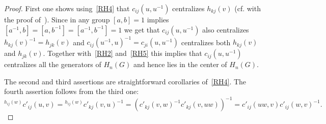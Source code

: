 \documentclass[oneside, 12pt]{amsart}
\theoremstyle{plain}
\numberwithin{equation}{section}
\numberwithin{lemma}{section}
\theoremstyle{remark}
\theoremstyle{definition}
\begin{document}
\begin{proof}
First one shows using~\eqref{RH4} that $c_{ij}(u, u^{-1})$ centralizes $h_{kj}(v)$ (cf. with the proof of~\cite[Lemma~2.1(2)]{Reh78}).
Since in any group $[a, b]=1$ implies $[a^{-1}, b] = [a, b^{-1}] = [a^{-1}, b^{-1}] = 1$ we get that $c_{ij}(u, u^{-1})$ also centralizes $h_{kj}(v)^{-1} = h_{jk}(v)$ and
 $c_{ij}(u^{-1}, u)^{-1} = c_{ji}(u, u^{-1})$ centralizes both $h_{kj}(v)$ and $h_{jk}(v)$.
Together with~\eqref{RH2} and~\eqref{RH5} this implies that $c_{ij}(u, u^{-1})$ centralizes all the generators of $H_n(G)$ and hence lies in the center of $H_n(G)$.

The second and third assertions are straightforward corollaries of~\eqref{RH4}.
The fourth assertion follows from the third one:
\[{}^{h_{ij}(w)} c'_{ij}(u, v) = {}^{h_{ij}(w)} c'_{kj}(v, u)^{-1} = (c'_{kj}(v, w)^{-1} c'_{kj}(v, uw))^{-1} = c'_{ij}(uw, v) c'_{ij}(w, v)^{-1}.\]

\end{proof}
\end{document}
